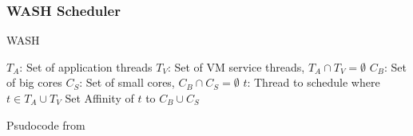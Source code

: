 \documentclass{beamer}
\begin{document}
	\begin{frame}
		\frametitle{WASH Scheduler}
		\vspace*{-4mm}
		\begin{algorithm}[H]
		\caption{WASH}\label{euclid}
		\begin{algorithmic}
				\State $T_A$: Set of application threads
				\State $T_V$: Set of VM service threads, $T_A \cap T_V = \emptyset$
				\State $C_B$: Set of big cores
				\State $C_S$: Set of small cores, $C_B \cap C_S = \emptyset$
				\State $t$: Thread to schedule where $t \in T_A \cup T_V$
					\EndIf
						\State Set Affinity of $t$ to $C_B \cup C_S$
					\EndIf
				\EndIf
			\EndFunction
		\end{algorithmic}
		\end{algorithm}
		\vspace*{-2mm}
		Psudocode from \cite{Jibaja:2016:PPA:2854038.2854047}
	\end{frame}
	
	\begin{frame}
		
		{}
	\end{frame}
\end{document}
